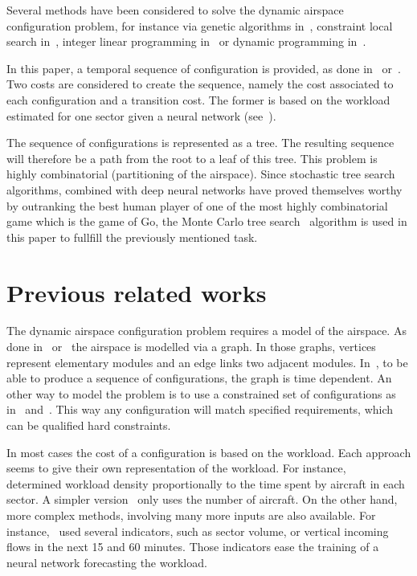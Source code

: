 \documentclass[oneside,twocolumn]{article}
\begin{document}
Several methods have been considered to solve the dynamic airspace configuration
problem, for instance via genetic algorithms in~\cite{sergeeva2017dynamic},
constraint local search in~\cite{jagare2013airspace}, integer linear
programming in~\cite{treimuth2016branch} or dynamic programming
in~\cite{bloem2010dynamic}.

In this paper, a temporal sequence of configuration is provided, as done
in~\cite{treimuth2016branch} or~\cite{sergeeva2017dynamic}.
Two costs are considered to create the sequence, namely the cost
associated to each configuration and a transition cost. The former is based on
the workload estimated for one sector given a neural network
(see~\cite{gianazza2010forecasting}).

The sequence of configurations is represented as a tree. The resulting
sequence will therefore be a path from the root to a leaf of this tree. This
problem is highly combinatorial (partitioning of the airspace). Since stochastic
tree search algorithms, combined with deep neural networks have proved
themselves worthy by outranking the best human player of one of the most highly
combinatorial game which is the game of Go, the Monte Carlo tree
search~\cite{browne2012survey} algorithm is used in this paper to fullfill the
previously mentioned task.



\section{Previous related works}\label{sec:previous_related_works}

The dynamic airspace configuration problem requires a model of the airspace. As
done in~\cite{sergeeva2017dynamic} or~\cite{treimuth2016branch} the airspace
is modelled via a graph. In those graphs, vertices represent elementary modules
and an edge links two adjacent modules. In~\cite{treimuth2016branch}, to be
able to produce a sequence of configurations, the graph is time dependent.
An other way to model the problem is to use a constrained set of
configurations as in~\cite{gianazza2010forecasting} and~\cite{bloem2010dynamic}.
This way any configuration will match specified requirements, which can be
qualified hard constraints.

In most cases the cost of a configuration is based on the workload. Each
approach seems to give their own representation of the workload. For instance,
~\cite{bedouet2016towards} determined workload density proportionally to the time
spent by aircraft in each sector. A simpler version~\cite{sergeeva2017dynamic}
only uses the number of aircraft. On the other hand, more complex methods,
involving many more inputs are also available. For
instance,~\cite{gianazza2010forecasting} used several indicators, such as sector
volume, or vertical incoming flows in the next 15 and 60 minutes. Those
indicators ease the training of a neural network forecasting the workload.
\end{document}
